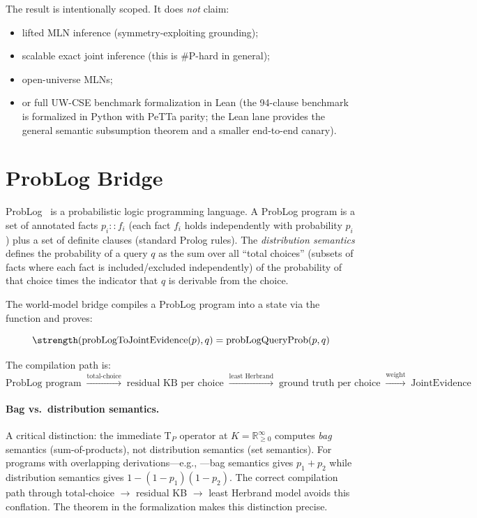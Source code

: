 \documentclass[11pt,openany]{report}
\begin{document}
The result is intentionally scoped.  It does \emph{not} claim:
\begin{itemize}
\item lifted MLN inference (symmetry-exploiting grounding);
\item scalable exact joint inference (this is \#P-hard in general);
\item open-universe MLNs;
\item or full UW-CSE benchmark formalization in Lean (the 94-clause
  benchmark is formalized in Python with PeTTa parity; the Lean lane
  provides the general semantic subsumption theorem and a smaller
  end-to-end canary).
\end{itemize}


\section{ProbLog Bridge}
\label{sec:problog-bridge}

ProbLog~\cite{DeRaedt2007ProbLog} is a probabilistic logic programming
language.  A ProbLog program is a set of annotated facts
$p_i :: f_i$ (each fact $f_i$ holds independently with probability $p_i$)
plus a set of definite clauses (standard Prolog rules).  The \emph{distribution
semantics} defines the probability of a query $q$ as the sum over all
``total choices'' (subsets of facts where each fact is included/excluded
independently) of the probability of that choice times the indicator that
$q$ is derivable from the choice.

The world-model bridge compiles a ProbLog program into a
 state via the  function
and proves:

\begin{theorem}
\[
  \strength(\mathrm{probLogToJointEvidence}(p), q)
    = \mathrm{probLogQueryProb}(p, q)
\]
\end{theorem}

\noindent
The compilation path is:
\[
  \text{ProbLog program} \;\xrightarrow{\text{total-choice}}\;
  \text{residual KB per choice} \;\xrightarrow{\text{least Herbrand}}\;
  \text{ground truth per choice} \;\xrightarrow{\text{weight}}\;
  \text{JointEvidence}
\]

\paragraph{Bag vs.\ distribution semantics.}
A critical distinction: the immediate T$_P$ operator at
$K = \mathbb{R}_{\ge 0}^\infty$ computes \emph{bag} semantics
(sum-of-products), not distribution semantics (set semantics).  For
programs with overlapping derivations---e.g.,
---bag semantics gives $p_1 + p_2$ while
distribution semantics gives $1 - (1 - p_1)(1 - p_2)$.  The correct
compilation path through total-choice $\to$ residual KB $\to$ least
Herbrand model avoids this conflation.  The 
theorem in the formalization makes this distinction precise.
\end{document}
